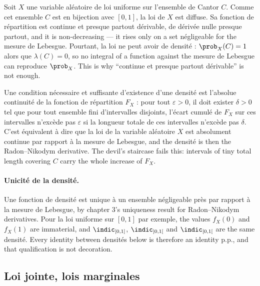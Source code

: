 \begin{example}
  Soit $X$ une variable aléatoire de loi uniforme sur l'ensemble de Cantor $C$.
  Comme cet ensemble $C$ est en bijection avec $[0,1]$, la loi de $X$ est diffuse.
  Sa fonction de répartition est continue et presque partout dérivable, de dérivée
  nulle presque partout, and it is non-decreasing --- it rises only on a set
  négligeable for the mesure de Lebesgue. Pourtant, la loi ne peut avoir de
  densité : $\prob_{X}(C) = 1$ alors que $\lambda(C) = 0$, so no integral of a
  function against the mesure de Lebesgue can reproduce $\prob_{X}$. This is why
  ``continue et presque partout dérivable'' is not enough.
\end{example}

\begin{remark}
  Une condition nécessaire et suffisante d'existence d'une densité est l'absolue
  continuité de la fonction de répartition $F_{X}$ : pour tout $\varepsilon > 0$,
  il doit exister $\delta > 0$ tel que pour tout ensemble fini d'intervalles
  disjoints, l'écart cumulé de $F_{X}$ sur ces intervalles n'excède pas
  $\varepsilon$ si la longueur totale de ces intervalles n'excède pas $\delta$.
  C'est équivalent à dire que la loi de la variable aléatoire $X$ est absolument
  continue par rapport à la mesure de Lebesgue, and the densité is then the
  Radon--Nikodym derivative. The devil's staircase fails this: intervals of tiny
  total length covering $C$ carry the whole increase of $F_{X}$.
\end{remark}

\paragraph{Unicité de la densité.}
Une fonction de densité est unique à un ensemble négligeable près par rapport à
la mesure de Lebesgue, by chapter 3's uniqueness result for Radon--Nikodym
derivatives. Pour la loi uniforme sur $[0,1]$ par exemple, the values $f_{X}(0)$
and $f_{X}(1)$ are immaterial, and $\indic_{[0,1]}$, $\indic_{]0,1[}$ and
$\indic_{[0,1[}$ are the same densité. Every identity between densités below is
therefore an identity p.p., and that qualification is not decoration.

\subsection{Loi jointe, lois marginales}

